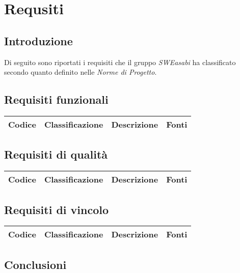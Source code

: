 \chapter{Requsiti}

\section{Introduzione}
Di seguito sono riportati i requisiti che il gruppo \textit{SWEasabi} ha classificato secondo quanto definito nelle \textit{Norme di Progetto}.

\section{Requisiti funzionali}

\begin{tabular}{|c|c|c|c|}
\hline
Codice & Classificazione & Descrizione & Fonti \\
\hline

\end{tabular}

\section{Requisiti di qualità}

\begin{tabular}{|c|c|c|c|}
\hline
Codice & Classificazione & Descrizione & Fonti \\
\hline

\end{tabular}

\section{Requisiti di vincolo}

\begin{tabular}{|c|c|c|c|}
\hline
Codice & Classificazione & Descrizione & Fonti \\
\hline

\end{tabular}

\section{Conclusioni}